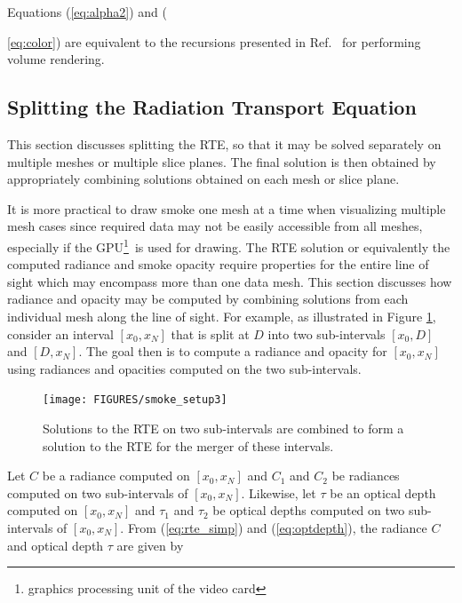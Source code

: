Equations (\ref{eq:alpha2}) and ({\ref{eq:color}) are equivalent to the recursions presented in Ref.~\cite[Chapter 39]{gpugems} for performing volume rendering.


\subsection{Splitting the Radiation Transport Equation}
This section discusses splitting the RTE, so that it may be solved separately on multiple meshes or multiple slice planes.  The final solution is then obtained by  appropriately combining solutions obtained on each mesh or slice plane.

It is more practical to draw smoke one mesh at a time when visualizing multiple mesh cases since required data may not be easily accessible from all meshes, especially if the GPU\footnote{graphics processing unit of the video card}\ is used for drawing.  The RTE solution or equivalently the computed radiance and smoke opacity require  properties for the entire line of sight which may encompass more than one data mesh.  This section discusses how  radiance and opacity may be computed by combining solutions from each individual mesh along the line of sight.  For example, as illustrated in Figure \ref{figsmokesetup3}, consider an interval $[x_0,x_N]$ that is split at $D$ into two sub-intervals $[x_0,D]$ and $[D,x_N]$.  The goal then is to compute a radiance and opacity for $[x_0,x_N]$ using radiances and opacities computed on  the two sub-intervals.

\begin{figure}[\figoptions]
\begin{center}
\texttt{[image: FIGURES/smoke\_setup3]}
\end{center}
\caption {Solutions to the RTE on two sub-intervals are combined to form a solution to the RTE
for the merger of these intervals.}
\label{figsmokesetup3}
\end{figure}

Let $C$ be a radiance computed on $[x_0,x_N]$ and $C_1$ and $C_2$ be radiances computed on two sub-intervals of $[x_0,x_N]$.  Likewise, let $\tau$ be an optical depth computed on $[x_0,x_N]$ and $\tau_1$ and $\tau_2$ be optical depths computed on two sub-intervals of $[x_0,x_N]$.
From (\ref{eq:rte_simp}) and (\ref{eq:optdepth}), the radiance $C$ and optical depth $\tau$ are given by

}
